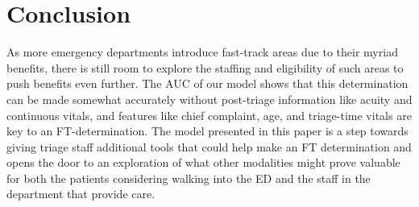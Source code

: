 \documentclass[sigconf]{acmart}
\begin{document}
\section{Conclusion}
As more emergency departments introduce fast-track areas due to their myriad benefits, there is still room to explore the staffing and eligibility of such areas to push benefits even further. The AUC of our model shows that this determination can be made somewhat accurately without post-triage information like acuity and continuous vitals, and features like chief complaint, age, and triage-time vitals are key to an FT-determination. The model presented in this paper is a step towards giving triage staff additional tools that could help make an FT determination and opens the door to an exploration of what other modalities might prove valuable for both the patients considering walking into the ED and the staff in the department that provide care.




\end{document}
